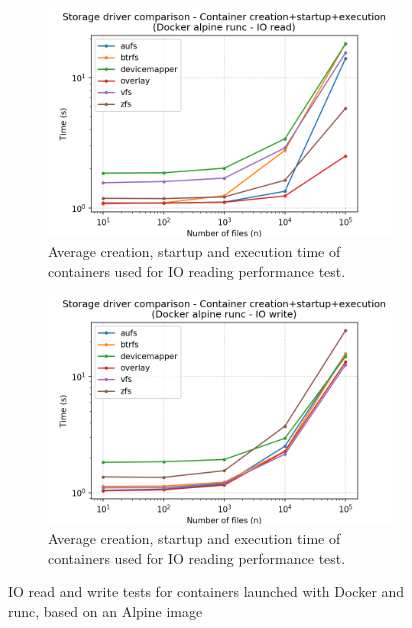 \begin{figure}[!h]
    \begin{subfigure}{.5\textwidth}
      \centering
      \includegraphics[width=\linewidth]{images/storage-driver/storage-driver-full-Docker-alpine-runc---IO-read.png}
      \caption{Average creation, startup and execution time of containers used for IO reading performance test.}
      \label{fig:storage-driver:io-read-full}
    \end{subfigure}
    \begin{subfigure}{.5\textwidth}
      \centering
      \includegraphics[width=\linewidth]{images/storage-driver/storage-driver-full-Docker-alpine-runc---IO-write.png}
      \caption{Average creation, startup and execution time of containers used for IO reading performance test.}
      \label{fig:storage-driver:io-write-full}
    \end{subfigure}
    
    \caption{IO read and write tests for containers launched with Docker and runc, based on an Alpine image}
\end{figure}

